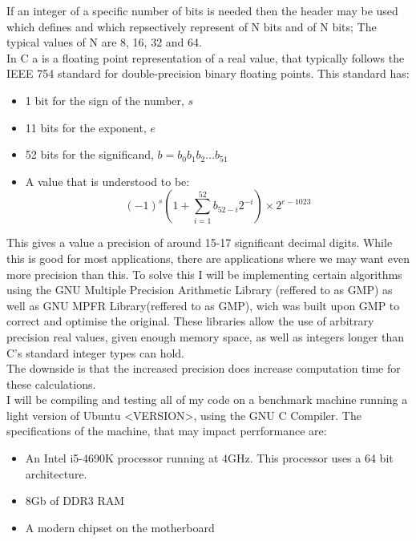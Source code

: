 If an integer of a specific number of bits is needed then the header  may be used which defines  and  which repsectively represent  of N bits and  of N bits; The typical values of N are 8, 16, 32 and 64.\\

In C a  is a floating point representation of a real value, that typically follows the IEEE 754 standard for double-precision binary floating points. This standard has:
\begin{itemize}
\item 1 bit for the sign of the number, \(s\)
\item 11 bits for the exponent, \(e\)
\item 52 bits for the significand, \(b = b_0b_1b_2\dots b_{51}\)
\item A value that is understood to be:
	\[(-1)^s\left(1 + \sum_{i=1}^{52}b_{52-i}2^{-i}\right) \times 2^{e-1023
}\]
\end{itemize}

This gives a  value a precision of around 15-17 significant decimal digits. While this is good for most applications, there are applications where we may want even more precision than this. To solve this I will be implementing certain algorithms using the GNU Multiple Precision Arithmetic Library (reffered to as GMP) as well as GNU MPFR Library(reffered to as GMP), wich was built upon GMP to correct and optimise the original. These libraries allow the use of arbitrary precision real values, given enough memory space, as well as integers longer than C's standard integer types can hold.\\

The downside is that the increased precision does increase computation time for these calculations.\\

I will be compiling and testing all of my code on a benchmark machine running a light version of Ubuntu <VERSION>, using the GNU C Compiler. The specifications of the machine, that may impact perrformance are:
\begin{itemize}
\item An Intel i5-4690K processor running at 4GHz. This processor uses a 64 bit architecture.
\item 8Gb of DDR3 RAM
\item A modern chipset on the motherboard
\end{itemize}
